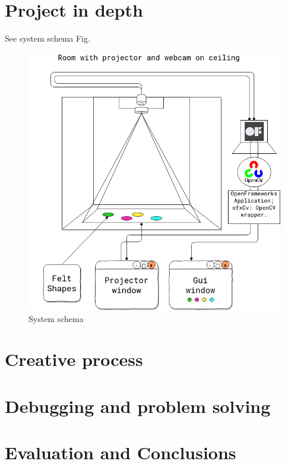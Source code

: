 \documentclass[12pt]{report}
\begin{document}
\chapter{Project in depth}
\label{sec:orgaf198c3}

See system schema Fig.  

\begin{figure}[htbp]
\centering
\includegraphics[width=15cm]{assets/project-schema-final.png}
\caption{System schema \label{systemSchema}}
\end{figure}


\chapter{Creative process}
\label{sec:orgeba3de9}
\chapter{Debugging and problem solving}
\label{sec:org04b6182}
\chapter{Evaluation and Conclusions}
\label{sec:orgb1ec848}
 

\end{document}
